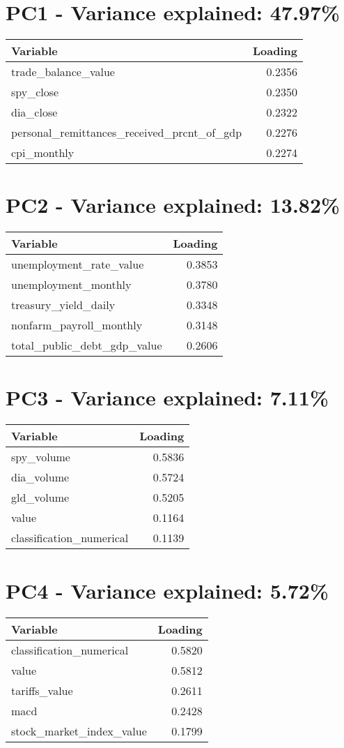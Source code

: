 \section*{PC1 - Variance explained: 47.97\%}
\begin{tabular}{lr}
\toprule
Variable & Loading \\
\midrule
trade\_balance\_value & 0.2356 \\
spy\_close & 0.2350 \\
dia\_close & 0.2322 \\
personal\_remittances\_received\_prcnt\_of\_gdp & 0.2276 \\
cpi\_monthly & 0.2274 \\
\bottomrule
\end{tabular}

\section*{PC2 - Variance explained: 13.82\%}
\begin{tabular}{lr}
\toprule
Variable & Loading \\
\midrule
unemployment\_rate\_value & 0.3853 \\
unemployment\_monthly & 0.3780 \\
treasury\_yield\_daily & 0.3348 \\
nonfarm\_payroll\_monthly & 0.3148 \\
total\_public\_debt\_gdp\_value & 0.2606 \\
\bottomrule
\end{tabular}

\section*{PC3 - Variance explained: 7.11\%}
\begin{tabular}{lr}
\toprule
Variable & Loading \\
\midrule
spy\_volume & 0.5836 \\
dia\_volume & 0.5724 \\
gld\_volume & 0.5205 \\
value & 0.1164 \\
classification\_numerical & 0.1139 \\
\bottomrule
\end{tabular}

\section*{PC4 - Variance explained: 5.72\%}
\begin{tabular}{lr}
\toprule
Variable & Loading \\
\midrule
classification\_numerical & 0.5820 \\
value & 0.5812 \\
tariffs\_value & 0.2611 \\
macd & 0.2428 \\
stock\_market\_index\_value & 0.1799 \\
\bottomrule
\end{tabular}

